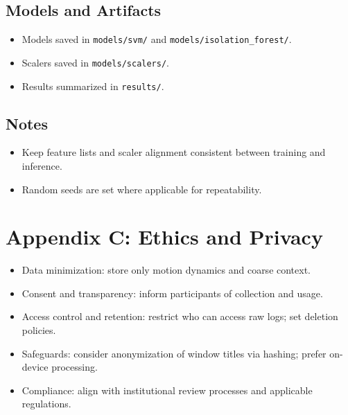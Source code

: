 \documentclass[
  12pt,
  a4paper,
]{report}
\providecommand{\tightlist}{%
  \setlength{\itemsep}{0pt}\setlength{\parskip}{0pt}}
\begin{document}
\section{Models and Artifacts}\label{models-and-artifacts}

\begin{itemize}
\tightlist
\item
  Models saved in \texttt{models/svm/} and
  \texttt{models/isolation\_forest/}.
\item
  Scalers saved in \texttt{models/scalers/}.
\item
  Results summarized in \texttt{results/}.
\end{itemize}

\section{Notes}\label{notes}

\begin{itemize}
\tightlist
\item
  Keep feature lists and scaler alignment consistent between training
  and inference.
\item
  Random seeds are set where applicable for repeatability.
\end{itemize}

\chapter{Appendix C: Ethics and
Privacy}\label{appendix-c-ethics-and-privacy}

\begin{itemize}
\tightlist
\item
  Data minimization: store only motion dynamics and coarse context.
\item
  Consent and transparency: inform participants of collection and usage.
\item
  Access control and retention: restrict who can access raw logs; set
  deletion policies.
\item
  Safeguards: consider anonymization of window titles via hashing;
  prefer on-device processing.
\item
  Compliance: align with institutional review processes and applicable
  regulations.
\end{itemize}
\end{document}
